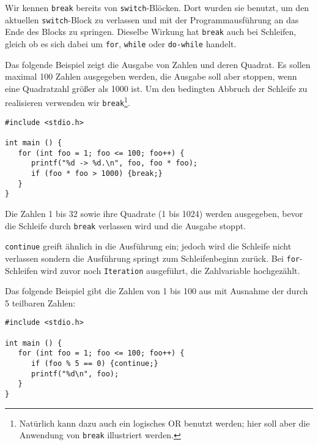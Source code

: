 Wir kennen \texttt{break} bereits von \texttt{switch}-Blöcken. Dort wurden sie benutzt, um den aktuellen \texttt{switch}-Block zu verlassen und mit der Programmausführung an das Ende des Blocks zu springen. Dieselbe Wirkung hat \texttt{break} auch bei Schleifen, gleich ob es sich dabei um \texttt{for}, \texttt{while} oder \texttt{do-while} handelt.

Das folgende Beispiel zeigt die Ausgabe von Zahlen und deren Quadrat. Es sollen maximal 100 Zahlen ausgegeben werden, die Ausgabe soll aber stoppen, wenn eine Quadratzahl größer als 1000 ist. Um den bedingten Abbruch der Schleife zu realisieren verwenden wir \texttt{break}\footnote{Natürlich kann dazu auch ein logisches OR benutzt werden; hier soll aber die Anwendung von \texttt{break} illustriert werden.}.

\begin{codebox}
\begin{verbatim}
#include <stdio.h>

int main () {
   for (int foo = 1; foo <= 100; foo++) {
      printf("%d -> %d.\n", foo, foo * foo);
      if (foo * foo > 1000) {break;}
   }
}
\end{verbatim}
\end{codebox}

Die Zahlen 1 bis 32 sowie ihre Quadrate (1 bis 1024) werden ausgegeben, bevor die Schleife durch  \texttt{break} verlassen wird und die Ausgabe stoppt.

\texttt{continue} greift ähnlich in die Ausführung ein; jedoch wird die Schleife nicht verlassen sondern die Ausführung springt zum Schleifenbeginn zurück. Bei \texttt{for}-Schleifen wird zuvor noch \texttt{Iteration} ausgeführt, \ie \eg die Zahlvariable hochgezählt.

Das folgende Beispiel gibt die Zahlen von 1 bis 100 aus mit Ausnahme der durch 5 teilbaren Zahlen:

\begin{codebox}
\begin{verbatim}
#include <stdio.h>

int main () {
   for (int foo = 1; foo <= 100; foo++) {
      if (foo % 5 == 0) {continue;}
      printf("%d\n", foo);
   }
}
\end{verbatim}
\end{codebox}
